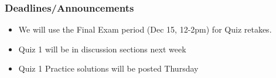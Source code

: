 
\begin{frame}
    \frametitle{Deadlines/Announcements}
\begin{itemize}
            \item We will use the Final Exam period (Dec 15, 12-2pm) for Quiz retakes.
            \item Quiz 1 will be in discussion sections next week
            \item Quiz 1 Practice solutions will be posted Thursday
        \end{itemize}
\end{frame}
